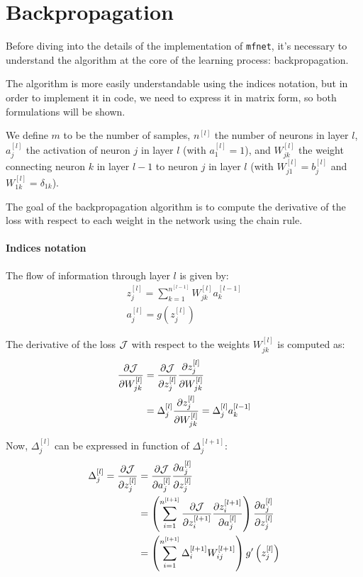 \section{Backpropagation}
Before diving into the details of the implementation of \texttt{mfnet}, it's necessary to understand the algorithm at the core of the learning process: backpropagation.

The algorithm is more easily understandable using the indices notation, but in order to implement it in code, we need to express it in matrix form, so both formulations will be shown.

We define $m$ to be the number of samples, $n^{[l]}$ the number of neurons in layer $l$, $a_j^{[l]}$ the activation of neuron $j$ in layer $l$ (with $a_1^{[l]} = 1$), and $W_{jk}^{[l]}$ the weight connecting neuron $k$ in layer $l-1$ to neuron $j$ in layer $l$ (with $W_{j1}^{[l]} = b_j^{[l]}$ and $W_{1k}^{[l]} = \delta_{1k}$).

The goal of the backpropagation algorithm is to compute the derivative of the loss with respect to each weight in the network using the chain rule.

\paragraph{Indices notation}
The flow of information through layer $l$ is given by:
\begin{gather*}
    z_j^{[l]} = \sum_{k=1}^{n^{[l-1]}} W_{jk}^{[l]} a_k^{[l-1]} \\
    a_j^{[l]} = g\left(z_j^{[l]}\right)
\end{gather*}

The derivative of the loss $\mathcal{J}$ with respect to the weights $W_{jk}^{[l]}$ is computed as:
\begin{align*}
    \pdv{\mathcal{J}}{W_{jk}^{[l]}} &= \pdv{\mathcal{J}}{z_j^{[l]}} \pdv{z_j^{[l]}}{W_{jk}^{[l]}}\\
    &= \Delta_j^{[l]} \pdv{z_j^{[l]}}{W_{jk}^{[l]}} = \Delta_j^{[l]} a_k^{[l-1]}
\end{align*}

Now, $\Delta_j^{[l]}$ can be expressed in function of $\Delta_j^{[l + 1]}$:
\begin{align*}
    \Delta_j^{[l]} = \pdv{\mathcal{J}}{z_j^{[l]}} &= \pdv{\mathcal{J}}{a_j^{[l]}} \pdv{a_j^{[l]}}{z_j^{[l]}}\\
    &= \left( \sum_{i=1}^{n^{[l + 1]}} \pdv{\mathcal{J}}{z_i^{[l+1]}} \pdv{z_i^{[l+1]}}{a_j^{[l]}} \right) \pdv{a_j^{[l]}}{z_j^{[l]}}\\
    &= \left( \sum_{i=1}^{n^{[l + 1]}} \Delta_i^{[l+1]} W_{ij}^{[l+1]} \right) g'\left(z_j^{[l]}\right)
\end{align*}

